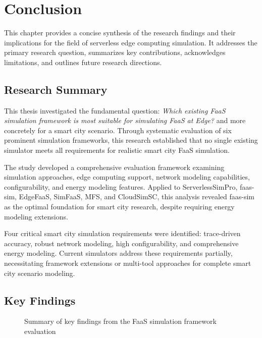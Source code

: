 \chapter{Conclusion}

This chapter provides a concise synthesis of the research findings and their implications for the field of serverless edge computing simulation. It addresses the primary research question, summarizes key contributions, acknowledges limitations, and outlines future research directions.

\section{Research Summary}

This thesis investigated the fundamental question: \textit{Which existing FaaS simulation framework is most suitable for simulating FaaS at Edge?} and more concretely for a smart city scenario. Through systematic evaluation of six prominent simulation frameworks, this research established that no single existing simulator meets all requirements for realistic smart city FaaS simulation.

The study developed a comprehensive evaluation framework examining simulation approaches, edge computing support, network modeling capabilities, configurability, and energy modeling features. Applied to ServerlessSimPro, faas-sim, EdgeFaaS, SimFaaS, MFS, and CloudSimSC, this analysis revealed faas-sim as the optimal foundation for smart city research, despite requiring energy modeling extensions.

Four critical smart city simulation requirements were identified: trace-driven accuracy, robust network modeling, high configurability, and comprehensive energy modeling. Current simulators address these requirements partially, necessitating framework extensions or multi-tool approaches for complete smart city scenario modeling.

\section{Key Findings}

\begin{figure}[htbp]
\centering
{}
\caption{Summary of key findings from the FaaS simulation framework evaluation}
\label{fig:key-findings}
\end{figure}

